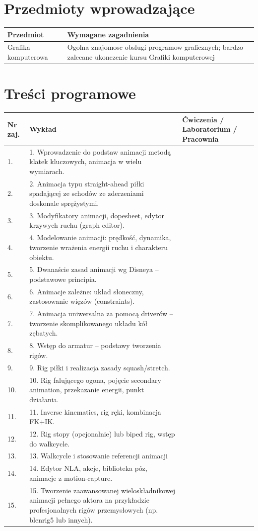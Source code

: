 \documentclass[12pt, a4paper]{article}
\begin{document}
\section{Przedmioty wprowadzające}

\begin{tabularx}{\textwidth}{lX}
  \hline
  \textbf{Przedmiot} & \textbf{Wymagane zagadnienia} \\
  \hline
  Grafika komputerowa & Ogolna znajomosc obslugi programow graficznych; bardzo zalecane ukonczenie kursu Grafiki komputerowej \\
  \hline
\end{tabularx}

\section{Treści programowe}

\begin{longtable}{|p{1.5cm}|p{6.5cm}|p{6.5cm}|}
\hline
\textbf{Nr zaj.} & \textbf{Wykład} & \textbf{Ćwiczenia / Laboratorium / Pracownia} \\\hline
\endhead
  \hline
  1. & 1. Wprowadzenie do podstaw animacji metodą klatek kluczowych, animacja w wielu wymiarach. &  \\
  \hline
  2. & 2. Animacja typu straight-ahead piłki spadającej ze schodów ze zderzeniami doskonale sprężystymi. &  \\
  \hline
  3. & 3. Modyfikatory animacji, dopesheet, edytor krzywych ruchu (graph editor). &  \\
  \hline
  4. & 4. Modelowanie animacji: prędkość, dynamika, tworzenie wrażenia energii ruchu i charakteru obiektu. &  \\
  \hline
  5. & 5. Dwanaście zasad animacji wg Disneya – podstawowe principia. &  \\
  \hline
  6. & 6. Animacje zależne: układ słoneczny, zastosowanie więzów (constraints). &  \\
  \hline
  7. & 7. Animacja uniwersalna za pomocą driverów – tworzenie skomplikowanego układu kół zębatych. &  \\
  \hline
  8. & 8. Wstęp do armatur – podstawy tworzenia rigów. &  \\
  \hline
  9. & 9. Rig piłki i realizacja zasady squash/stretch. &  \\
  \hline
  10. & 10. Rig falującego ogona, pojęcie secondary animation, przekazanie energii, punkt działania. &  \\
  \hline
  11. & 11. Inverse kinematics, rig ręki, kombinacja FK+IK. &  \\
  \hline
  12. & 12. Rig stopy (opcjonalnie) lub biped rig, wstęp do walkcycle. &  \\
  \hline
  13. & 13. Walkcycle i stosowanie referencji animacji &  \\
  \hline
  14. & 14. Edytor NLA, akcje, biblioteka póz, animacje z motion-capture. &  \\
  \hline
  15. & 15. Tworzenie zaawansowanej wieloskładnikowej animacji pełnego aktora na przykładzie profesjonalnych rigów przemysłowych (np. blenrig5 lub innych). &  \\
  \hline
\end{longtable}
\end{document}

